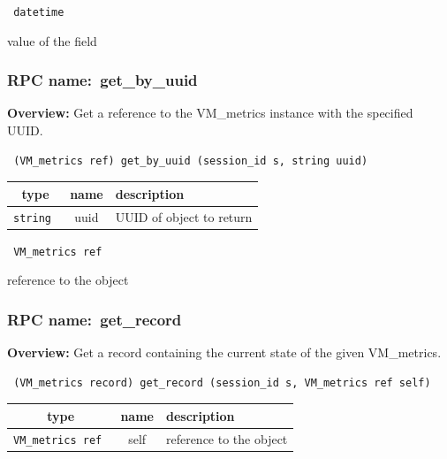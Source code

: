 \vspace{0.3cm}

{\tt 
datetime
}


value of the field
\vspace{0.3cm}
\vspace{0.3cm}
\vspace{0.3cm}
\subsubsection{RPC name:~get\_by\_uuid}

{\bf Overview:} 
Get a reference to the VM\_metrics instance with the specified UUID.

\begin{verbatim} (VM_metrics ref) get_by_uuid (session_id s, string uuid)\end{verbatim}



 
\vspace{0.3cm}
\begin{tabular}{|c|c|p{7cm}|}
 \hline
{\bf type} & {\bf name} & {\bf description} \\ \hline
{\tt string } & uuid & UUID of object to return \\ \hline 

\end{tabular}

\vspace{0.3cm}

{\tt 
VM\_metrics ref
}


reference to the object
\vspace{0.3cm}
\vspace{0.3cm}
\vspace{0.3cm}
\subsubsection{RPC name:~get\_record}

{\bf Overview:} 
Get a record containing the current state of the given VM\_metrics.

\begin{verbatim} (VM_metrics record) get_record (session_id s, VM_metrics ref self)\end{verbatim}



 
\vspace{0.3cm}
\begin{tabular}{|c|c|p{7cm}|}
 \hline
{\bf type} & {\bf name} & {\bf description} \\ \hline
{\tt VM\_metrics ref } & self & reference to the object \\ \hline 

\end{tabular}

